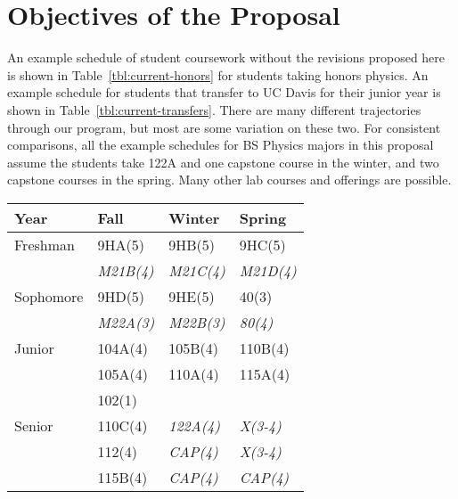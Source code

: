 \documentclass[12pt]{article}
\begin{document}
\newpage

\section{Objectives of the Proposal}

An example schedule of student coursework without the revisions
proposed here is shown in Table~\ref{tbl:current-honors} for students
taking honors physics.  An example schedule for students that transfer
to UC Davis for their junior year is shown in
Table~\ref{tbl:current-transfers}.  There are many different
trajectories through our program, but most are some variation on these
two.  For consistent comparisons, all the example schedules for BS
Physics majors in this proposal assume the students take 122A and one
capstone course in the winter, and two capstone courses in the spring.
Many other lab courses and offerings are possible.

\begin{center}
\begin{tabular}{|l|l|l|l|}
\hline
Year      & Fall    & Winter & Spring \\
\hline
Freshman  & 9HA(5)     & 9HB(5)     & 9HC(5) \\
          & {\it M21B(4)}  & {\it M21C(4)}  & {\it M21D(4)} \\
\hline
Sophomore & 9HD(5)     & 9HE(5)     & 40(3)     \\
          & {\it M22A(3)}     & {\it M22B(3)} & {\it 80(4)} \\
\hline
Junior    & 104A(4) & 105B(4) & 110B(4)\\
          & 105A(4) & 110A(4) & 115A(4)\\
          & 102(1)  &    &     \\
\hline
Senior    & 110C(4) & {\it 122A(4)} & {\it X(3-4)}\\
          & 112(4)  & {\it CAP(4)}   & {\it X(3-4)}\\
          & 115B(4) & {\it CAP(4)}   & {\it CAP(4)}\\

\hline 
\end{tabular}
\end{center}
\end{document}
